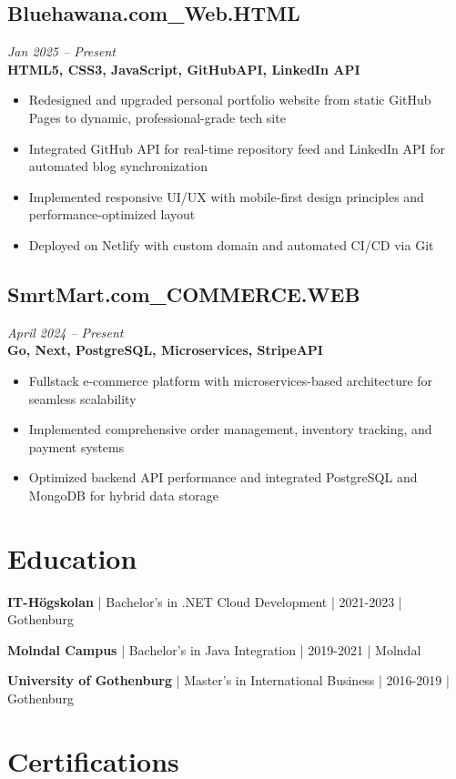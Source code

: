\documentclass[11pt,a4paper]{article}
\begin{document}
\subsection{Bluehawana.com\_Web.HTML}
\textit{Jan 2025 -- Present} \\
\textbf{HTML5, CSS3, JavaScript, GitHubAPI, LinkedIn API}
\begin{itemize}
\item Redesigned and upgraded personal portfolio website from static GitHub Pages to dynamic, professional-grade tech site
\item Integrated GitHub API for real-time repository feed and LinkedIn API for automated blog synchronization
\item Implemented responsive UI/UX with mobile-first design principles and performance-optimized layout
\item Deployed on Netlify with custom domain and automated CI/CD via Git
\end{itemize}

\subsection{SmrtMart.com\_COMMERCE.WEB}
\textit{April 2024 -- Present} \\
\textbf{Go, Next, PostgreSQL, Microservices, StripeAPI}
\begin{itemize}
\item Fullstack e-commerce platform with microservices-based architecture for seamless scalability
\item Implemented comprehensive order management, inventory tracking, and payment systems
\item Optimized backend API performance and integrated PostgreSQL and MongoDB for hybrid data storage
\end{itemize}

\section*{Education}

\textbf{IT-Högskolan} | Bachelor's in .NET Cloud Development | 2021-2023 | Gothenburg

\textbf{Molndal Campus} | Bachelor's in Java Integration | 2019-2021 | Molndal

\textbf{University of Gothenburg} | Master's in International Business | 2016-2019 | Gothenburg

\section*{Certifications}
\end{document}
